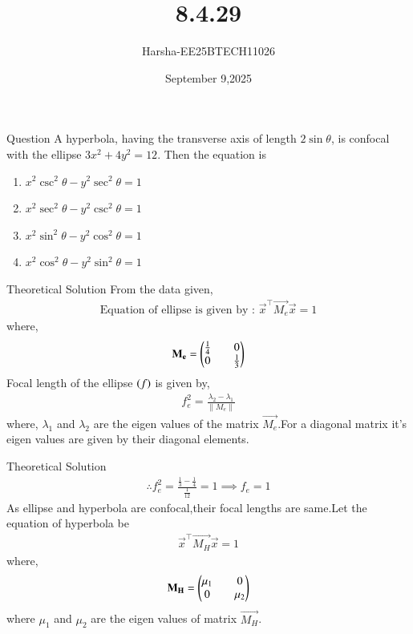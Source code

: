 \documentclass{beamer}
\title %
{8.4.29}
\date{September 9,2025}
\author %
{Harsha-EE25BTECH11026}
\begin{document}
\frame{\titlepage}


\begin{frame}{Question}
A hyperbola, having the transverse axis of length $2\sin{\theta}$, is confocal with the ellipse $3x^2+4y^2=12$. Then the equation is
\begin{enumerate}
    \item $x^2\csc^2{\theta}-y^2\sec^2{\theta}=1$
    \item $x^2\sec^2{\theta}-y^2\csc^2{\theta}=1$
    \item $x^2\sin^2{\theta}-y^2\cos^2{\theta}=1$
    \item $x^2\cos^2{\theta}-y^2\sin^2{\theta}=1$
\end{enumerate}
\end{frame}

\begin{frame}{Theoretical Solution}
From the data given,
\begin{align}
    \text{Equation of ellipse is given by : }\vec{x}^{\top}\vec{M_e}\vec{x}=1
\end{align}
where,
\begin{align}
    \mathbf{M_e}=\begin{pmatrix}\tfrac{1}{4}&&0\\0&&\tfrac{1}{3}\end{pmatrix}
\end{align}
Focal length of the ellipse $\left(f\right)$ is given by,
\begin{align}
    f_e^2=\frac{\lambda_2-\lambda_1}{\|M_e\|}
\end{align}
where, $\lambda_1$ and $\lambda_2$ are the eigen values of the matrix $\vec{M_e}$.For a diagonal matrix it's eigen values are given by their diagonal elements.
\end{frame}

\begin{frame}{Theoretical Solution}
\begin{align}
    \therefore f_e^2=\frac{\frac{1}{3}-\frac{1}{4}}{\frac{1}{12}}=1
    \implies f_e=1
\end{align}
As ellipse and hyperbola are confocal,their focal lengths are same.Let the equation of hyperbola be
\begin{align}
    \vec{x}^{\top}\vec{M_H}\vec{x}=1
\end{align}
where,
\begin{align}
    \mathbf{M_H}=\begin{pmatrix}\mu_1&&0\\0&&\mu_2\end{pmatrix}
\end{align}
where $\mu_1$ and $\mu_2$ are the eigen values of matrix $\vec{M_H}$.
\end{frame}
\end{document}

